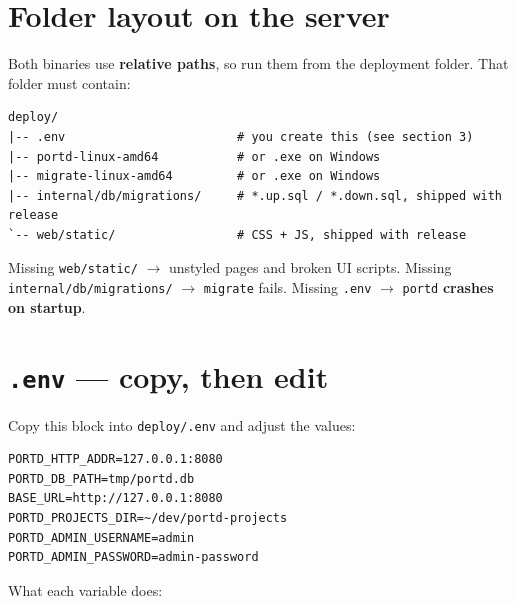 \documentclass[11pt,a4paper]{article}
\newcommand{\chemin}[1]{\texttt{#1}}
\begin{document}
\section{Folder layout on the server}

Both binaries use \textbf{relative paths}, so run them from the deployment folder. That folder must contain:

\begin{verbatim}
deploy/
|-- .env                        # you create this (see section 3)
|-- portd-linux-amd64           # or .exe on Windows
|-- migrate-linux-amd64         # or .exe on Windows
|-- internal/db/migrations/     # *.up.sql / *.down.sql, shipped with release
`-- web/static/                 # CSS + JS, shipped with release
\end{verbatim}

Missing \chemin{web/static/} $\rightarrow$ unstyled pages and broken UI scripts.
Missing \chemin{internal/db/migrations/} $\rightarrow$ \chemin{migrate} fails.
Missing \chemin{.env} $\rightarrow$ \chemin{portd} \textbf{crashes on startup}.

\section{\texttt{.env} — copy, then edit}

Copy this block into \chemin{deploy/.env} and adjust the values:

\begin{verbatim}
PORTD_HTTP_ADDR=127.0.0.1:8080
PORTD_DB_PATH=tmp/portd.db
BASE_URL=http://127.0.0.1:8080
PORTD_PROJECTS_DIR=~/dev/portd-projects
PORTD_ADMIN_USERNAME=admin
PORTD_ADMIN_PASSWORD=admin-password
\end{verbatim}

What each variable does:
\end{document}
